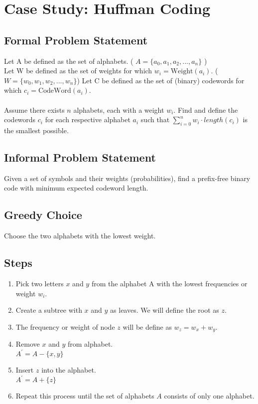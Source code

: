 \section{Case Study: Huffman Coding}

\subsection{Formal Problem Statement}
Let A be defined as the set of alphabets. ( $A = \{ a_0, a_1, a_2, ..., a_n \}$ )\\
Let W be defined as the set of weights for which $w_i = \text{Weight}(a_i)$.  ($W = \{ w_0, w_1, w_2, ..., w_n \}$)
Let C be defined as the set of (binary) codewords for which $c_i = \text{CodeWord}(a_i)$.\\\\
Assume there exists $n$ alphabets, each with a weight $w_i$. Find and define the codewords $c_i$ for each respective alphabet $a_i$ such that $\sum\limits_{i=0}^{n} w_i \cdot length(c_i)$ is the smallest possible.

\subsection{Informal Problem Statement}
Given a set of symbols and their weights (probabilities), find a prefix-free binary code with minimum expected codeword length.

\subsection{Greedy Choice}
Choose the two alphabets with the lowest weight. 

\subsection{Steps}
\begin{enumerate}
	\item Pick two letters $x$ and $y$ from the alphabet A with the lowest frequencies or weight $w_i$.
	\item Create a subtree with $x$ and $y$ as leaves. We will define the root as $z$.
	\item The frequency or weight of node $z$ will be define as $w_z = w_x + w_y$.
	\item Remove $x$ and $y$ from alphabet.\\
		$ A^\prime = A - \{ x, y \}$
	\item Insert $z$ into the alphabet.\\
		$ A^\prime = A + \{ z \} $
	\item Repeat this process until the set of alphabets $A$ consists of only one alphabet.
\end{enumerate}

